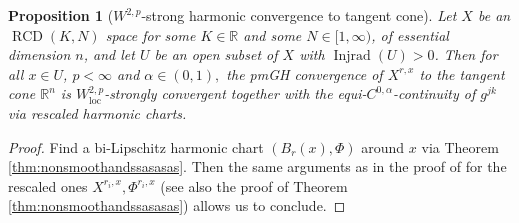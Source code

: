\documentclass[11pt,reqno]{amsart}
\newtheorem{proposition}[theorem]{Proposition}
\theoremstyle{definition}
\numberwithin{equation}{section}
\DeclareMathOperator{\Injrad}{Injrad}
\DeclareMathOperator{\loc}{loc}
\DeclareMathOperator{\RCD}{RCD}
\begin{document}
\begin{proposition}[$W^{2,p}$-strong harmonic convergence to tangent cone]\label{thm:nonsmoothand}
Let $X$ be an $\RCD(K, N)$ space for some $K \in \mathbb{R}$ and some $N \in [1, \infty)$, of essential dimension $n$,  
and let $U$ be an open subset of $X$ with
        $\Injrad(U)>0$.
Then for all $x \in U$, $p<\infty$ and $\alpha \in (0, 1),$
the pmGH convergence of $X^{r, x}$ to the tangent cone $\mathbb{R}^n$ is $W^{2,p}_{\loc}$-strongly convergent together with the equi-$C^{0,\alpha}$-continuity of $g^{jk}$ via rescaled harmonic charts. 
\end{proposition}
\begin{proof} 
Find a bi-Lipschitz harmonic chart $(B_r(x), \Phi)$ around $x$ via Theorem \ref{thm:nonsmoothandssasasas}. Then the same arguments as in the proof of \cite[Proposition 1.2]{AC} for the rescaled ones $X^{r_i,x}, \Phi^{r_i,x}$ (see also the proof of Theorem \ref{thm:nonsmoothandssasasas}) allows us to conclude.
\end{proof}






\end{document}
